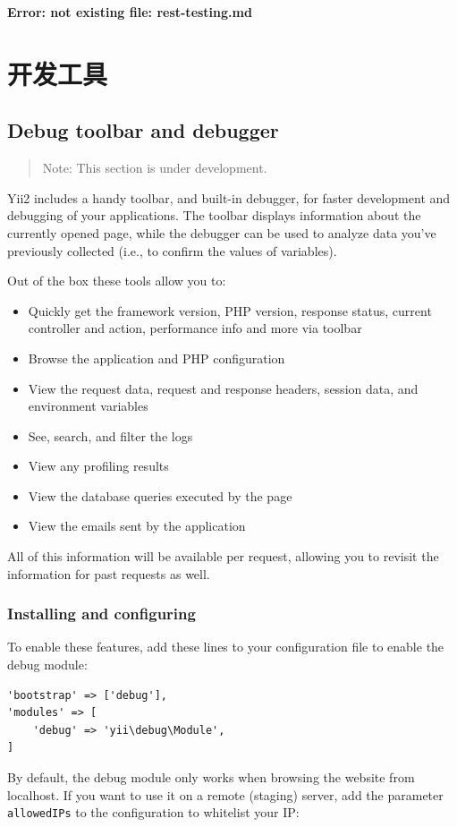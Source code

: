 \newpage\label{rest-testing.md}\textbf{Error: not existing file: rest-testing.md}\newpage
\chapter{开发工具}
\label{tool-debugger.md}\section{Debug toolbar and debugger}
\begin{quote}Note: This section is under development.

\end{quote}
Yii2 includes a handy toolbar, and built-in debugger, for faster development and debugging of your applications. The toolbar displays information
about the currently opened page, while the debugger can be used to analyze data you've previously collected (i.e., to confirm the values of variables).

Out of the box these tools allow you to:

\begin{itemize}
\item Quickly get the framework version, PHP version, response status, current controller and action, performance info and
more via toolbar
\item Browse the application and PHP configuration
\item View the request data, request and response headers, session data, and environment variables
\item See, search, and filter the logs
\item View any profiling results
\item View the database queries executed by the page
\item View the emails sent by the application
\end{itemize}
All of this information will be available per request, allowing you to revisit the information for past requests as well.

\subsection{Installing and configuring}
To enable these features, add these lines to your configuration file to enable the debug module:

\lstset{language=php}\begin{lstlisting}
'bootstrap' => ['debug'],
'modules' => [
    'debug' => 'yii\debug\Module',
]
\end{lstlisting}
By default, the debug module only works when browsing the website from localhost. If you want to use it on a remote (staging)
server, add the parameter \lstinline|allowedIPs| to the configuration to whitelist your IP:

